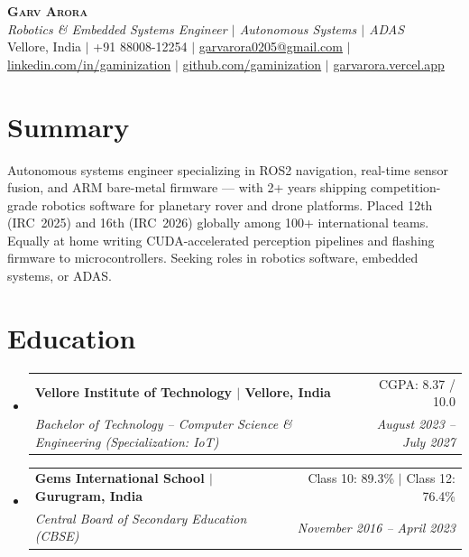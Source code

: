 \documentclass[letterpaper,10pt]{article}
\makeatletter
\newcommand{\resumeSubheading}[4]{
  \item
    \begin{tabular*}{0.97\textwidth}[t]{l@{\extracolsep{\fill}}r}
      \textbf{#1} & #2 \\
      \textit{\small#3} & \textit{\small #4} \\
    \end{tabular*}\vspace{-4pt}
}
\newcommand{\resumeSubHeadingListStart}{
  \begin{itemize}[leftmargin=0.15in, label={}, itemsep=1pt, parsep=0pt, topsep=1pt]
}
\newcommand{\resumeSubHeadingListEnd}{\end{itemize}}
\makeatother
\begin{document}
\begin{center}
    \textbf{\Huge \scshape Garv Arora} \\ \vspace{2pt}
    \small\textit{Robotics \& Embedded Systems Engineer $|$ Autonomous Systems $|$ ADAS} \\ \vspace{2pt}
    \small Vellore, India $|$
    +91 88008-12254 $|$
    \href{mailto:garvarora0205@gmail.com}{garvarora0205@gmail.com} $|$
    \href{https://linkedin.com/in/gaminization}{linkedin.com/in/gaminization} $|$
    \href{https://github.com/gaminization}{github.com/gaminization} $|$
    \href{https://garvarora.vercel.app/}{garvarora.vercel.app}
\end{center}

\section{Summary}
\vspace{1pt}
\small{Autonomous systems engineer specializing in ROS2 navigation, real-time sensor fusion, and ARM bare-metal firmware --- with 2+ years shipping competition-grade robotics software for planetary rover and drone platforms. Placed 12th (IRC~2025) and 16th (IRC~2026) globally among 100+ international teams. Equally at home writing CUDA-accelerated perception pipelines and flashing firmware to microcontrollers. Seeking roles in robotics software, embedded systems, or ADAS.}

\section{Education}
  \resumeSubHeadingListStart
    \resumeSubheading
      {Vellore Institute of Technology $|$ Vellore, India}{CGPA: 8.37 / 10.0}
      {Bachelor of Technology -- Computer Science \& Engineering (Specialization: IoT)}{August 2023 -- July 2027}
    \resumeSubheading
      {Gems International School $|$ Gurugram, India}{Class 10: 89.3\% $|$ Class 12: 76.4\%}
      {Central Board of Secondary Education (CBSE)}{November 2016 -- April 2023}
  \resumeSubHeadingListEnd

\end{document}
